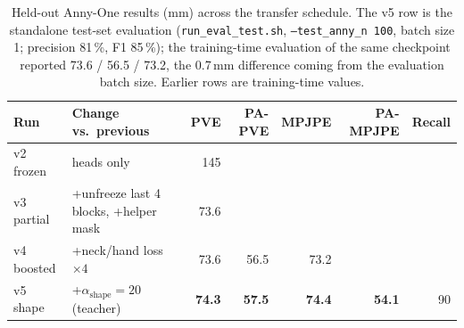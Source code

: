 
\begin{table}[h]
\centering\small
\begin{tabular}{llrrrrr}
\toprule
Run & Change vs.\ previous & PVE & PA-PVE & MPJPE & PA-MPJPE & Recall \\
\midrule
v2 frozen   & heads only                          & 145 & \TODO{} & \TODO{} & \TODO{} & \TODO{} \\
v3 partial  & +unfreeze last 4 blocks, +helper mask & 73.6 & \TODO{} & \TODO{} & \TODO{} & \TODO{} \\
v4 boosted  & +neck/hand loss $\times4$            & 73.6 & 56.5 & 73.2 & \TODO{} & \TODO{} \\
v5 shape    & +$\alpha_{\text{shape}}{=}20$ (teacher) & \textbf{74.3} & \textbf{57.5} & \textbf{74.4} & \textbf{54.1} & 90 \\
\bottomrule
\end{tabular}
\caption{Held-out Anny-One results (mm) across the transfer schedule. The v5
row is the standalone test-set evaluation (\texttt{run\_eval\_test.sh},
\texttt{--test\_anny\_n 100}, batch size 1; precision 81\,\%, F1 85\,\%); the
training-time evaluation of the same checkpoint reported 73.6 / 56.5 / 73.2,
the 0.7\,mm difference coming from the evaluation batch size. Earlier rows
are training-time values. }
\label{tab:main}
\end{table}
